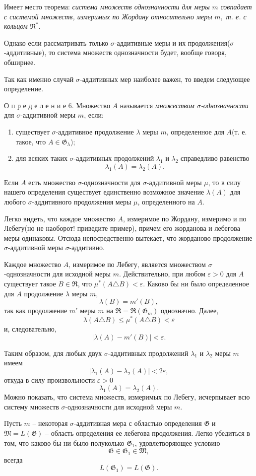 \documentclass[oneside]{book}
\begin{document}
    \par Имеет место теорема: \emph{система множеств однозначности для меры} $m$ \emph{совпадает с системой множеств, измеримых по Жордану
    относительно меры } $m,$ \emph{т. е. с кольцом} $\mathfrak{R}^\ast.$
    \par Однако если рассматривать только $\sigma$-аддитивные меры и их продолжения($\sigma$-аддитивные),
    то система множеств однозначности будет, вообще говоря, обширнее.
    \par Так как именно случай $\sigma$-аддитивных мер наиболее важен, то введем следующее определение.
    \par О п р е д е л е н и е 6. Множество $A$ называется \emph{множеством $\sigma$-однозначности} для $\sigma$-аддитивной меры $m$, если:
    \begin{enumerate}
        \item существует $\sigma$-аддитивное продолжение $\lambda$ меры $m$, определенное для $A$(т. е. такое, что $A \in \mathfrak{G}_\lambda$);
        \item для всяких таких $\sigma$-аддитивных продолжений $\lambda_1$ и $\lambda_2$ справедливо равенство $$ \lambda_1(A) = \lambda_2(A).$$
    \end{enumerate}
    Если $A$ есть множество $\sigma$-однозначности для $\sigma$-аддитивной меры $\mu$, то в силу нашего определения существует единственно возможное значение $\lambda(A)$
    для любого $\sigma$-аддитивного продолжения меры $\mu$, определенного на $A$.
    \par Легко видеть, что каждое множество $A$, измеримое по Жордану, измеримо и по Лебегу(но не наоборот! приведите пример),
    причем его жорданова и лебегова меры одинаковы. Отсюда непосредственно вытекает, что жорданово продолжение $\sigma$-аддитивной меры $\sigma$-аддитивно.
    \par Каждое множество $A$, измеримое по Лебегу, является множеством $\sigma$-однозначности для исходной меры $m$.
    Действительно, при любом $\varepsilon > 0$ для $A$ существует такое $B \in \mathfrak{R}$, что $\mu^\ast (A \triangle B) < \varepsilon$. 
    Каково бы ни было определенное для $A$ продолжение $\lambda$ меры $m$, $$ \lambda(B) = m'(B), $$
    так как продолжение $m'$ меры $m$ на $\mathfrak{R} = \mathfrak{R}(\mathfrak{G}_m)$ однозначно. Далее,
    $$ \lambda(A \triangle B) \leqslant \mu^\ast(A\triangle B) < \varepsilon $$ и, следовательно, 
    $$ |\lambda(A) - m'(B)| < \varepsilon.$$
    \par Таким образом, для любых двух $\sigma$-аддитивных продолжений $\lambda_1$ и $\lambda_2$ меры $m$ имеем
    $$ |\lambda_1(A) - \lambda_2(A)|<2\varepsilon, $$ откуда в силу произвольности $\varepsilon > 0$
    $$ \lambda_1(A) = \lambda_2(A).$$
    Можно показать, что система множеств, измеримых по Лебегу, исчерпывает всю систему множеств $\sigma$-однозначности для исходной меры $m$.
    \par Пусть $m$ -- некоторая $\sigma$-аддитивная мера с областью определения $\mathfrak{G}$ и $\mathfrak{M} = L(\mathfrak{G})$ -- область определения ее лебегова продолжения.
    Легко убедиться в том, что каково бы ни было полуколько $\mathfrak{G}_1$, удовлетворяющее условию 
    $$ \mathfrak{G} \in \mathfrak{G}_1 \in \mathfrak{M},$$
    всегда $$L(\mathfrak{G}_1) = L(\mathfrak{G}).$$
\end{document}
